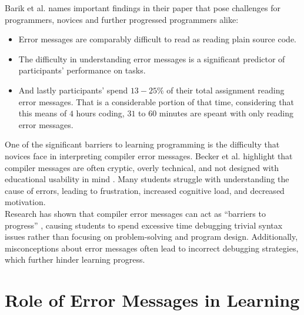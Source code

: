 Barik et al. \cite{barik} names important findings in their paper that pose challenges for programmers, novices and further progressed programmers alike:
\begin{itemize}[nosep]
    \item Error messages are comparably difficult to read as reading plain source code.
    \item The difficulty in understanding error messages is a significant predictor of participants' performance on tasks.
    \item And lastly participants' spend \(13-25\%\) of their total assignment reading error messages.
        That is a considerable portion of that time, considering that this means of \(4\) hours coding, \(31\) to \(60\) minutes are speant with only reading error messages.
\end{itemize}
One of the significant barriers to learning programming is the difficulty that novices face in interpreting compiler error messages.
Becker et al. highlight that compiler messages are often cryptic, overly technical, and not designed with educational usability in mind \cite{becker}.
Many students struggle with understanding the cause of errors, leading to frustration, increased cognitive load, and decreased motivation.\\[5pt]
Research has shown that compiler error messages can act as ``barriers to progress'' \cite{becker},
causing students to spend excessive time debugging trivial syntax issues rather than focusing on problem-solving and program design.
Additionally, misconceptions about error messages often lead to incorrect debugging strategies, which further hinder learning progress.


\section{Role of Error Messages in Learning} %




